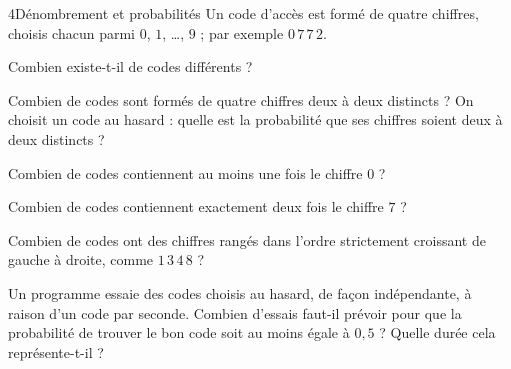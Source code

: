 

\begin{exoBac}{4}{Dénombrement et probabilités}
Un code d'accès est formé de quatre chiffres, choisis chacun parmi $0$, $1$, …, $9$ ; par exemple $0\,7\,7\,2$.
\begin{questions}
  \item Combien existe-t-il de codes différents ?
  \item Combien de codes sont formés de quatre chiffres deux à deux distincts ? On choisit un code au hasard : quelle est la
    probabilité que ses chiffres soient deux à deux distincts ?
  \item Combien de codes contiennent au moins une fois le chiffre $0$ ?
  \item Combien de codes contiennent exactement deux fois le chiffre $7$ ?
  \item Combien de codes ont des chiffres rangés dans l'ordre strictement croissant de gauche à droite, comme $1\,3\,4\,8$ ?
  \item Un programme essaie des codes choisis au hasard, de façon indépendante, à raison d'un code par seconde. Combien d'essais
    faut-il prévoir pour que la probabilité de trouver le bon code soit au moins égale à $0{,}5$ ? Quelle durée cela représente-t-il ?
\end{questions}
\end{exoBac}

